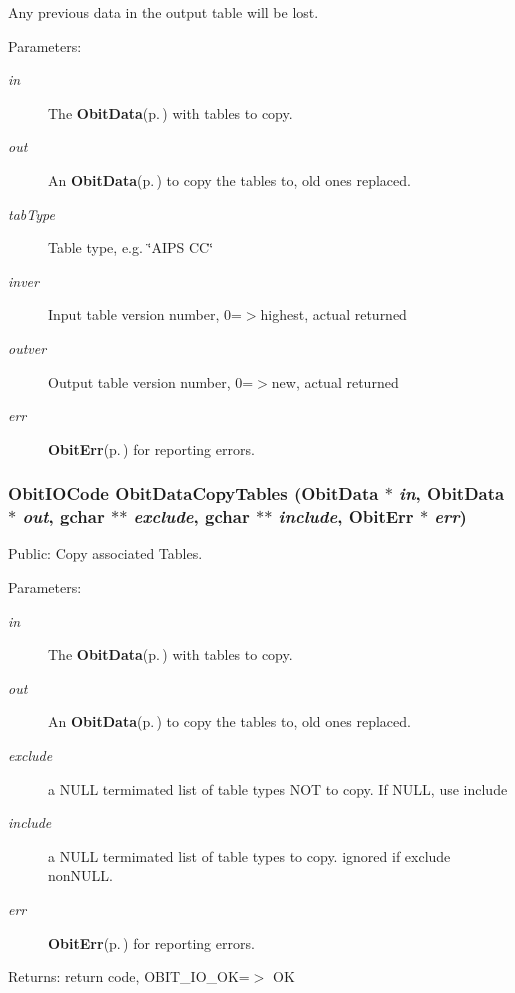 Any previous data in the output table will be lost. \begin{Desc}
\item[Parameters:]
\begin{description}
\item[{\em in}]The {\bf Obit\-Data}{\rm (p.\,\pageref{structObitData})} with tables to copy. \item[{\em out}]An {\bf Obit\-Data}{\rm (p.\,\pageref{structObitData})} to copy the tables to, old ones replaced. \item[{\em tab\-Type}]Table type, e.g. \char`\"{}AIPS CC\char`\"{} \item[{\em inver}]Input table version number, 0=$>$highest, actual returned \item[{\em outver}]Output table version number, 0=$>$new, actual returned \item[{\em err}]{\bf Obit\-Err}{\rm (p.\,\pageref{structObitErr})} for reporting errors. \end{description}
\end{Desc}
\subsubsection{\setlength{\rightskip}{0pt plus 5cm}Obit\-IOCode Obit\-Data\-Copy\-Tables ({\bf Obit\-Data} $\ast$ {\em in}, {\bf Obit\-Data} $\ast$ {\em out}, gchar $\ast$$\ast$ {\em exclude}, gchar $\ast$$\ast$ {\em include}, {\bf Obit\-Err} $\ast$ {\em err})}\label{ObitData_8c_a22}


Public: Copy associated Tables. 

\begin{Desc}
\item[Parameters:]
\begin{description}
\item[{\em in}]The {\bf Obit\-Data}{\rm (p.\,\pageref{structObitData})} with tables to copy. \item[{\em out}]An {\bf Obit\-Data}{\rm (p.\,\pageref{structObitData})} to copy the tables to, old ones replaced. \item[{\em exclude}]a NULL termimated list of table types NOT to copy. If NULL, use include \item[{\em include}]a NULL termimated list of table types to copy. ignored if exclude non\-NULL. \item[{\em err}]{\bf Obit\-Err}{\rm (p.\,\pageref{structObitErr})} for reporting errors. \end{description}
\end{Desc}
\begin{Desc}
\item[Returns:]return code, OBIT\_\-IO\_\-OK=$>$ OK \end{Desc}
